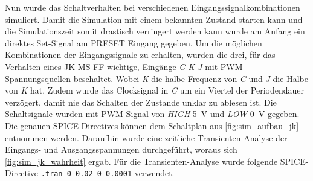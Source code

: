 \documentclass[12pt,english,ngerman]{scrartcl}
\begin{document}


Nun wurde das Schaltverhalten bei verschiedenen Eingangssignalkombinationen
simuliert. 
Damit die Simulation mit einem bekannten Zustand starten kann und die
Simulationszeit somit drastisch verringert werden kann wurde am Anfang ein
direktes Set-Signal am PRESET Eingang gegeben.
Um die möglichen Kombinationen der Eingangssignale zu erhalten, wurden
die drei, für das Verhalten eines JK-MS-FF wichtige, Eingänge \textit{C K J}
mit PWM-Spannungsquellen beschaltet. Wobei \textit{K} die halbe Frequenz von \textit{C} und \textit{J} die
Halbe von \textit{K} hat. Zudem wurde das Clocksignal in \textit{C} um ein Viertel der
Periodendauer verzögert, damit nie das Schalten der Zustande unklar zu ablesen
ist.
Die Schaltsignale wurden mit PWM-Signal von \textit{HIGH} \SI{5}{\volt} und
\textit{LOW} \SI{0}{\volt} gegeben. Die genauen SPICE-Directives können dem
Schaltplan aus \autoref{fig:sim_aufbau_jk} entnommen werden. Daraufhin wurde
eine zeitliche Transienten-Analyse der Eingangs- und Ausgangsspannungen
durchgeführt, woraus sich \autoref{fig:sim_jk_wahrheit} ergab. Für die
Transienten-Analyse wurde folgende SPICE-Directive \texttt{.tran 0 0.02 0 0.0001}
verwendet.
\end{document}

